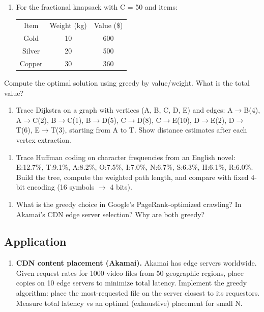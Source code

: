 \begin{enumerate}
\item For the fractional knapsack with C = 50 and items:
\begin{center}
\begin{tabular}{ccc}
\toprule
Item & Weight (kg) & Value (\$) \\
Gold & 10 & 600 \\
Silver & 20 & 500 \\
Copper & 30 & 360 \\
\bottomrule
\end{tabular}
\end{center}
\end{enumerate}
   Compute the optimal solution using greedy by value/weight. What is the total value?

\begin{enumerate}
\item Trace Dijkstra on a graph with vertices (A, B, C, D, E) and edges: A$\to $B(4), A$\to $C(2), B$\to $C(1), B$\to $D(5), C$\to $D(8), C$\to $E(10), D$\to $E(2), D$\to $T(6), E$\to $T(3), starting from A to T. Show distance estimates after each vertex extraction.
\end{enumerate}

\begin{enumerate}
\item Trace Huffman coding on character frequencies from an English novel: E:12.7\%, T:9.1\%, A:8.2\%, O:7.5\%, I:7.0\%, N:6.7\%, S:6.3\%, H:6.1\%, R:6.0\%. Build the tree, compute the weighted path length, and compare with fixed 4-bit encoding (16 symbols $\to $ 4 bits).
\end{enumerate}

\begin{enumerate}
\item What is the greedy choice in Google's PageRank-optimized crawling? In Akamai's CDN edge server selection? Why are both greedy?
\end{enumerate}

\subsection{Application}

\begin{enumerate}
\item \textbf{CDN content placement (Akamai).} Akamai has edge servers worldwide. Given request rates for 1000 video files from 50 geographic regions, place copies on 10 edge servers to minimize total latency. Implement the greedy algorithm: place the most-requested file on the server closest to its requestors. Measure total latency vs an optimal (exhaustive) placement for small N.
\end{enumerate}

